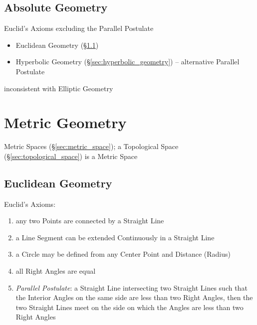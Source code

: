 \subsection{Absolute Geometry}\label{sec:absolute_geometry}

Euclid's Axioms excluding the Parallel Postulate

\begin{itemize}
  \item Euclidean Geometry (\S\ref{sec:euclidean_geometry})
  \item Hyperbolic Geometry (\S\ref{sec:hyperbolic_geometry}) -- alternative
    Parallel Postulate
\end{itemize}

inconsistent with Elliptic Geometry



\section{Metric Geometry}\label{sec:metric_geometry}

Metric Spaces (\S\ref{sec:metric_space}); a Topological Space
(\S\ref{sec:topological_space}) is a Metric Space



\subsection{Euclidean Geometry}\label{sec:euclidean_geometry}

Euclid's Axioms:
\begin{enumerate}
  \item any two Points are connected by a Straight Line
  \item a Line Segment can be extended Continuously in a Straight Line
  \item a Circle may be defined from any Center Point and Distance (Radius)
  \item all Right Angles are equal
  \item \emph{Parallel Postulate}: a Straight Line intersecting two Straight
    Lines such that the Interior Angles on the same side are less than two Right
    Angles, then the two Straight Lines meet on the side on which the Angles are
    less than two Right Angles
\end{enumerate}

